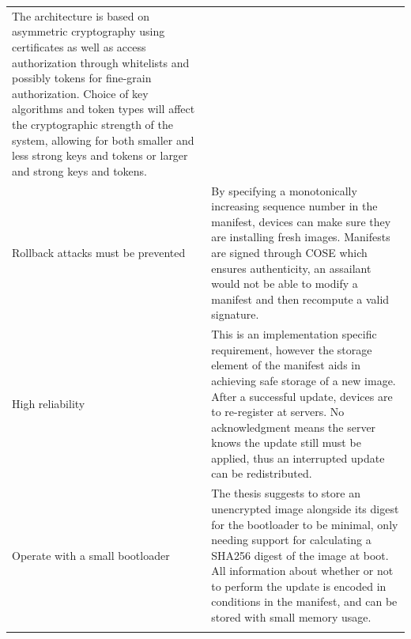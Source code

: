 \documentclass[0-thesis.tex]{subfiles}
\begin{document}
\begin{longtable}[]{@{}ll@{}}
\begin{minipage}[t]{0.53\columnwidth}
    The architecture is based on asymmetric cryptography using certificates
    as well as access authorization through whitelists and possibly tokens
    for fine-grain authorization. Choice of key algorithms and token types
    will affect the cryptographic strength of the system, allowing for both
    smaller and less strong keys and tokens or larger and strong keys and
    tokens.\strut
    \end{minipage}\tabularnewline
    \begin{minipage}[t]{0.41\columnwidth}\raggedright\strut
    Rollback attacks must be prevented\strut
    \end{minipage} & \begin{minipage}[t]{0.53\columnwidth}\raggedright\strut
    By specifying a monotonically increasing sequence number in the
    manifest, devices can make sure they are installing fresh images.
    Manifests are signed through COSE which ensures authenticity, an
    assailant would not be able to modify a manifest and then recompute a
    valid signature.\strut
    \end{minipage}\tabularnewline
    \begin{minipage}[t]{0.41\columnwidth}\raggedright\strut
    High reliability\strut
    \end{minipage} & \begin{minipage}[t]{0.53\columnwidth}\raggedright\strut
    This is an implementation specific requirement, however the storage
    element of the manifest aids in achieving safe storage of a new image.
    After a successful update, devices are to re-register at servers. No
    acknowledgment means the server knows the update still must be applied,
    thus an interrupted update can be redistributed.\strut
    \end{minipage}\tabularnewline
    \begin{minipage}[t]{0.41\columnwidth}\raggedright\strut
    Operate with a small bootloader\strut
    \end{minipage} & \begin{minipage}[t]{0.53\columnwidth}\raggedright\strut
    The thesis suggests to store an unencrypted image alongside its digest
    for the bootloader to be minimal, only needing support for calculating a
    SHA256 digest of the image at boot. All information about whether or not
    to perform the update is encoded in conditions in the manifest, and can
    be stored with small memory usage.\strut
    \end{minipage}\tabularnewline
    \begin{minipage}[t]{0.41\columnwidth}\raggedright\strut

\end{minipage}
\end{longtable}
\end{document}
